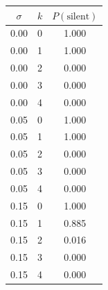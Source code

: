 \begin{tabular}{ccc}
\toprule
$\sigma$ & $k$ & $P(\text{silent})$ \\
\midrule
0.00 & 0 & 1.000 \\
0.00 & 1 & 1.000 \\
0.00 & 2 & 0.000 \\
0.00 & 3 & 0.000 \\
0.00 & 4 & 0.000 \\
0.05 & 0 & 1.000 \\
0.05 & 1 & 1.000 \\
0.05 & 2 & 0.000 \\
0.05 & 3 & 0.000 \\
0.05 & 4 & 0.000 \\
0.15 & 0 & 1.000 \\
0.15 & 1 & 0.885 \\
0.15 & 2 & 0.016 \\
0.15 & 3 & 0.000 \\
0.15 & 4 & 0.000 \\
\bottomrule
\end{tabular}
